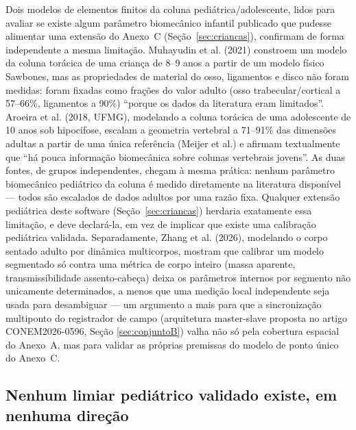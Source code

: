 \documentclass[11pt,a4paper]{article}
\begin{document}
Dois modelos de elementos finitos da coluna pediátrica/adolescente, lidos para
avaliar se existe algum parâmetro biomecânico infantil publicado que pudesse
alimentar uma extensão do Anexo~C (Seção~\ref{sec:criancas}), confirmam de
forma independente a mesma limitação. Muhayudin et al. (2021) constroem um
modelo da coluna torácica de uma criança de 8--9 anos a partir de um modelo
físico Sawbones, mas as propriedades de material do osso, ligamentos e disco
não foram medidas: foram fixadas como frações do valor adulto (osso
trabecular/cortical a 57--66\%, ligamentos a 90\%) ``porque os dados da
literatura eram limitados''. Aroeira et al. (2018, UFMG), modelando a coluna
torácica de uma adolescente de 10 anos sob hipocifose, escalam a geometria
vertebral a 71--91\% das dimensões adultas a partir de uma única referência
(Meijer et al.) e afirmam textualmente que ``há pouca informação biomecânica
sobre colunas vertebrais jovens''. As duas fontes, de grupos independentes,
chegam à mesma prática: nenhum parâmetro biomecânico pediátrico da coluna é
medido diretamente na literatura disponível --- todos são escalados de dados
adultos por uma razão fixa. Qualquer extensão pediátrica deste software
(Seção~\ref{sec:criancas}) herdaria exatamente essa limitação, e deve
declará-la, em vez de implicar que existe uma calibração pediátrica validada.
Separadamente, Zhang et al. (2026), modelando o corpo sentado adulto por
dinâmica multicorpos, mostram que calibrar um modelo segmentado só contra uma
métrica de corpo inteiro (massa aparente, transmissibilidade assento-cabeça)
deixa os parâmetros internos por segmento não unicamente determinados, a menos
que uma medição local independente seja usada para desambiguar --- um
argumento a mais para que a sincronização multiponto do registrador de campo
(arquitetura master-slave proposta no artigo CONEM2026-0596, Seção
\ref{sec:conjuntoB}) valha não só pela cobertura espacial do Anexo~A, mas
para validar as próprias premissas do modelo de ponto único do Anexo~C.

\subsection{Nenhum limiar pediátrico validado existe, em nenhuma direção}
\end{document}
